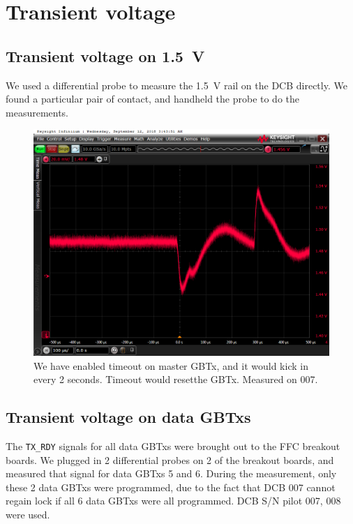 \documentclass[11pt,letterpaper]{refart}
\begin{document}
\section{Transient voltage}
\subsection{Transient voltage on \SI{1.5}{\volt}}
We used a differential probe to measure the \SI{1.5}{\volt} rail on the DCB
directly.
We found a particular pair of contact, and handheld the probe to do the
measurements.

\begin{figure}[ht]
    \centering
    \includegraphics[width=0.8\linewidth]
        {./res/voltage_transient/time_out.png}
    \caption[Voltage transient due to timeout]{
        We have enabled timeout on master GBTx, and it would kick in every 2
        seconds.
        Timeout would reset\protect\footnotemark the GBTx.
        Measured on 007.
    }
\end{figure}


\subsection{Transient voltage on data GBTxs}
The \texttt{TX\_RDY} signals for all data GBTxs were brought out to the FFC
breakout boards.
We plugged in 2 differential probes on 2 of the breakout boards, and measured
that signal for data GBTxs 5 and 6.
During the measurement, only these 2 data GBTxs were programmed, due to the fact
that DCB 007 cannot regain lock if all 6 data GBTxs were all programmed.
DCB S/N pilot 007, 008 were used.
\end{document}
